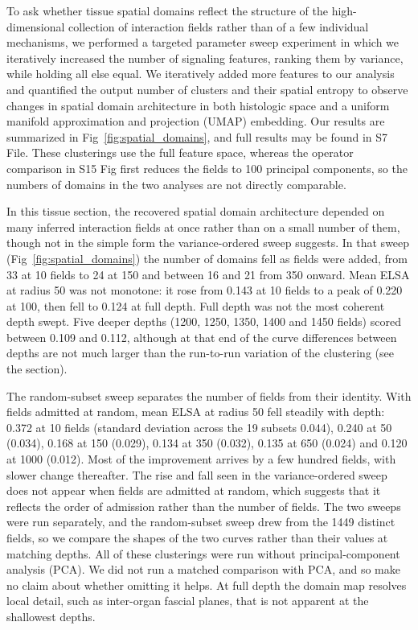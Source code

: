 \documentclass[10pt,letterpaper]{article}
\begin{document}
To ask whether tissue spatial domains reflect the structure of the high-dimensional collection of interaction fields rather than of a few individual mechanisms, we performed a targeted parameter sweep experiment in which we iteratively increased the number of signaling features, ranking them by variance, while holding all else equal. We iteratively added more features to our analysis and quantified the output number of clusters and their spatial entropy to observe changes in spatial domain architecture in both histologic space and a uniform manifold approximation and projection (UMAP) embedding. Our results are summarized in Fig~\ref{fig:spatial_domains}, and full results may be found in S7 File. These clusterings use the full feature space, whereas the operator comparison in S15 Fig first reduces the fields to 100 principal components, so the numbers of domains in the two analyses are not directly comparable.

In this tissue section, the recovered spatial domain architecture depended on many inferred interaction fields at once rather than on a small number of them, though not in the simple form the variance-ordered sweep suggests. In that sweep (Fig~\ref{fig:spatial_domains}) the number of domains fell as fields were added, from 33 at 10 fields to 24 at 150 and between 16 and 21 from 350 onward. Mean ELSA at radius 50 was not monotone: it rose from 0.143 at 10 fields to a peak of 0.220 at 100, then fell to 0.124 at full depth. Full depth was not the most coherent depth swept. Five deeper depths (1200, 1250, 1350, 1400 and 1450 fields) scored between 0.109 and 0.112, although at that end of the curve differences between depths are not much larger than the run-to-run variation of the clustering (see the  section).

The random-subset sweep separates the number of fields from their identity. With fields admitted at random, mean ELSA at radius 50 fell steadily with depth: 0.372 at 10 fields (standard deviation across the 19 subsets 0.044), 0.240 at 50 (0.034), 0.168 at 150 (0.029), 0.134 at 350 (0.032), 0.135 at 650 (0.024) and 0.120 at 1000 (0.012). Most of the improvement arrives by a few hundred fields, with slower change thereafter. The rise and fall seen in the variance-ordered sweep does not appear when fields are admitted at random, which suggests that it reflects the order of admission rather than the number of fields. The two sweeps were run separately, and the random-subset sweep drew from the 1449 distinct fields, so we compare the shapes of the two curves rather than their values at matching depths. All of these clusterings were run without principal-component analysis (PCA). We did not run a matched comparison with PCA, and so make no claim about whether omitting it helps. At full depth the domain map resolves local detail, such as inter-organ fascial planes, that is not apparent at the shallowest depths.
\end{document}
